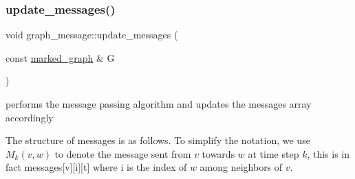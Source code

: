 \mbox{\label{classgraph__message_a40dadc59d582b290202e79bc4a9e896c}} 
\subsubsection{\texorpdfstring{update\+\_\+messages()}{update\_messages()}}
{\footnotesize\ttfamily void graph\+\_\+message\+::update\+\_\+messages (\begin{DoxyParamCaption}\item[{const \hyperlink{classmarked__graph}{marked\+\_\+graph} \&}]{G }\end{DoxyParamCaption})\hspace{0.3cm}{\ttfamily [private]}}



performs the message passing algorithm and updates the messages array accordingly 

The structure of messages is as follows. To simplify the notation, we use $M_k(v,w)$ to denote the message sent from $v$ towards $w$ at time step $k$, this is in fact messages\mbox{[}v\mbox{]}\mbox{[}i\mbox{]}\mbox{[}t\mbox{]} where i is the index of $w$ among neighbors of $v$.


